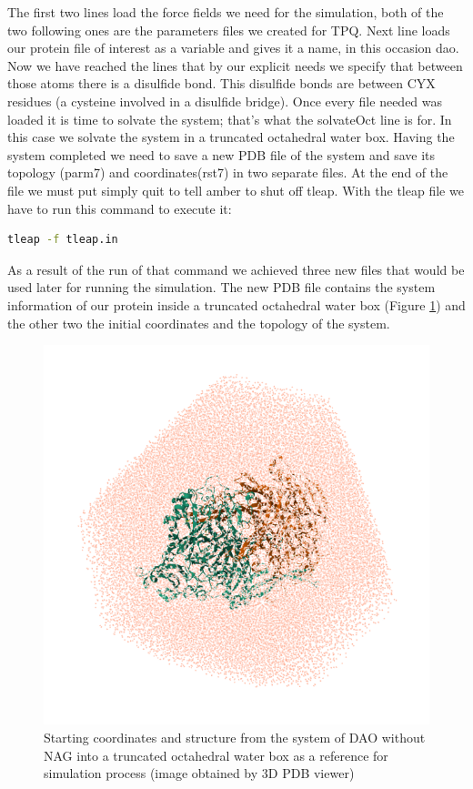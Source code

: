 \documentclass[a4paper]{article}
\begin{document}
The first two lines load the force fields we need for the simulation, both of the two following ones are the parameters files we created for TPQ. Next line loads our protein file of interest as a variable and gives it a name, in this occasion dao. Now we have reached the lines that by our explicit needs we specify that between those atoms there is a disulfide bond. This disulfide bonds are between CYX residues (a cysteine involved in a disulfide bridge).
Once every file needed was loaded it is time to solvate the system; that's what the solvateOct line is for. In this case we solvate the system in a truncated octahedral water box. Having the system completed we need to save a new PDB file of the system and save its topology (parm7) and coordinates(rst7) in two separate files. At the end of the file we must put simply quit to tell amber to shut off tleap. With the tleap file we have to run this command to execute it:


\begin{lstlisting}[language=Bash,caption={Trehalose prepgen}]
   tleap -f tleap.in
\end{lstlisting}

As a result of the run of that command we achieved three new files that would be used later for running the simulation. The new PDB file contains the system information of our protein inside a truncated octahedral water box (Figure \ref{fig:DAOWAT}) and the other two the initial coordinates and the topology of the system.

\begin{figure}[h]
    \centering
    \includegraphics[width = 0.6\hsize]{./figures/DAOWAT.PDB}
    \caption{Starting coordinates and structure from the system of DAO without NAG into a truncated octahedral water box as a reference for simulation process (image obtained by 3D PDB viewer)}
    \label{fig:DAOWAT}
\end{figure}
\end{document}

